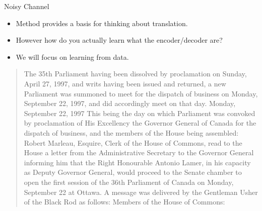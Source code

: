 \documentclass{beamer}
\begin{document}
\begin{frame}{Noisy Channel}
  \begin{itemize}
  \item Method provides a basis for thinking about translation.
    \air 
  \item However how do you actually learn what the encoder/decoder are?
    \air 

  \item We will focus on learning from data. 
  \end{itemize}
\end{frame}

\begin{frame}
  \begin{small}
  \begin{quote}
    The 35th Parliament having been dissolved by proclamation on
    Sunday, April 27, 1997, and writs having been issued and returned,
    a new Parliament was summoned to meet for the dispatch of business
    on Monday, September 22, 1997, and did accordingly meet on that
    day.  Monday, September 22, 1997 This being the day on which
    Parliament was convoked by proclamation of His Excellency the
    Governor General of Canada for the dispatch of business, and the
    members of the House being assembled: Robert Marleau, Esquire,
    Clerk of the House of Commons, read to the House a letter from the
    Administrative Secretary to the Governor General informing him
    that the Right Honourable Antonio Lamer, in his capacity as Deputy
    Governor General, would proceed to the Senate chamber to open the
    first session of the 36th Parliament of Canada on Monday,
    September 22 at Ottawa.  A message was delivered by the Gentleman
    Usher of the Black Rod as follows: Members of the House of
    Commons: 
  \end{quote}
  \end{small}
\end{frame}
\end{document}
